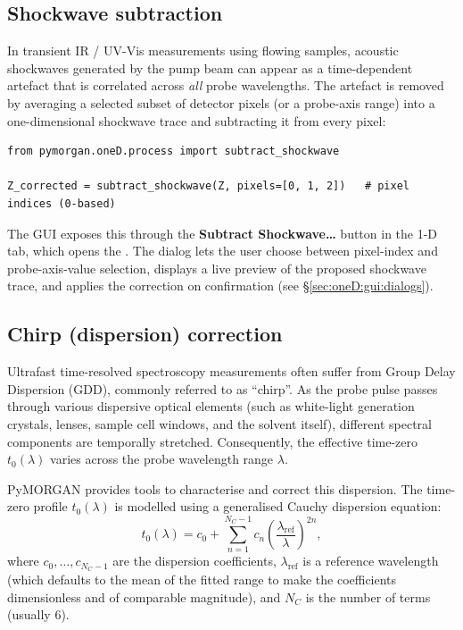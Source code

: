 \subsection{Shockwave subtraction}\label{sec:shockwave}
In transient IR / UV-Vis measurements using flowing samples, acoustic shockwaves
generated by the pump beam can appear as a time-dependent artefact that is
correlated across \emph{all} probe wavelengths. The artefact is removed by
averaging a selected subset of detector pixels (or a probe-axis range) into a
one-dimensional shockwave trace and subtracting it from every pixel:
\begin{lstlisting}
from pymorgan.oneD.process import subtract_shockwave

Z_corrected = subtract_shockwave(Z, pixels=[0, 1, 2])   # pixel indices (0-based)
\end{lstlisting}

The GUI exposes this through the \textbf{Subtract Shockwave\ldots} button in the
1-D tab, which opens the . The dialog lets the
user choose between pixel-index and probe-axis-value selection, displays a live
preview of the proposed shockwave trace, and applies the correction on
confirmation (see \S\ref{sec:oneD:gui:dialogs}).

\subsection{Chirp (dispersion) correction}\label{sec:chirp}
Ultrafast time-resolved spectroscopy measurements often suffer from Group Delay Dispersion (GDD), commonly referred to as ``chirp''. As the probe pulse passes through various dispersive optical elements (such as white-light generation crystals, lenses, sample cell windows, and the solvent itself), different spectral components are temporally stretched. Consequently, the effective time-zero $t_0(\lambda)$ varies across the probe wavelength range $\lambda$.

PyMORGAN provides tools to characterise and correct this dispersion. The time-zero profile $t_0(\lambda)$ is modelled using a generalised Cauchy dispersion equation:
\begin{equation}
  t_0(\lambda) = c_0 + \sum_{n=1}^{N_C-1} c_n \left(\frac{\lambda_{\mathrm{ref}}}{\lambda}\right)^{2n},
\end{equation}
where $c_0, \dots, c_{N_C-1}$ are the dispersion coefficients, $\lambda_{\mathrm{ref}}$ is a reference wavelength (which defaults to the mean of the fitted range to make the coefficients dimensionless and of comparable magnitude), and $N_C$ is the number of terms (usually $6$).

